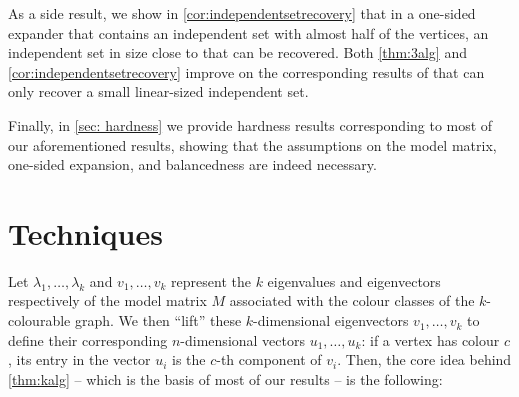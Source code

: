 As a side result, we show in \cref{cor:independentsetrecovery} that in a one-sided expander that contains an independent set with almost half of the vertices, an independent set in size close to that can be recovered. Both \cref{thm:3alg} and \cref{cor:independentsetrecovery} improve on the corresponding results of \cite{bafna-hsieh-kothari} that can only recover a small linear-sized independent set.

Finally, in \cref{sec: hardness} we provide hardness results corresponding to most of our aforementioned results, showing that the assumptions on the model matrix, one-sided expansion, and balancedness are indeed necessary.

\section{Techniques}

Let $\lambda_1, \ldots, \lambda_k$ and $v_1, \ldots, v_k$ represent the $k$ eigenvalues and eigenvectors respectively of the model matrix $M$ associated with the colour classes of the $k$-colourable graph. We then ``lift'' these $k$-dimensional eigenvectors $v_1, \ldots, v_k$ to define their corresponding $n$-dimensional vectors $u_1, \ldots, u_k$: if a vertex has colour $c$, its entry in the vector $u_i$ is the $c$-th component of $v_i$. Then, the core idea behind \cref{thm:kalg} -- which is the basis of most of our results -- is the following:

